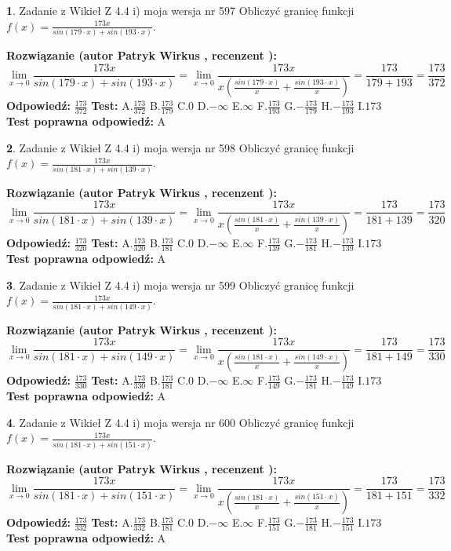 \documentclass[12pt, a4paper]{article}
\theoremstyle{definition} %
\newtheorem{zad}{}
\newcommand{\zadStart}[1]{\begin{zad}#1\newline}
\newcommand{\zadStop}{\end{zad}}
\newcommand{\rozwStart}[2]{\noindent \textbf{Rozwiązanie (autor #1 , recenzent #2): }\newline}
\newcommand{\rozwStop}{\newline}
\newcommand{\odpStart}{\noindent \textbf{Odpowiedź:}\newline}
\newcommand{\odpStop}{\newline}
\newcommand{\testStart}{\noindent \textbf{Test:}\newline}
\newcommand{\testStop}{\newline}
\newcommand{\kluczStart}{\noindent \textbf{Test poprawna odpowiedź:}\newline}
\newcommand{\kluczStop}{\newline}
\begin{document}
\zadStart{Zadanie z Wikieł Z 4.4 i) moja wersja nr 597}
Obliczyć granicę funkcji $f(x)=\frac{173x}{sin(179\cdot x) +sin(193\cdot x)}$.
\zadStop
\rozwStart{Patryk Wirkus}{}
$$\lim\limits_{x\to 0}\frac{173x}{sin(179\cdot x) +sin(193\cdot x)}=\lim\limits_{x\to 0}\frac{173x}{x(\frac{sin(179\cdot x)}{x}+\frac{sin(193\cdot x)}{x})}=\frac{173}{179+193} = \frac{173}{372}$$
\rozwStop
\odpStart
$\frac{173}{372}$
\odpStop
\testStart
A.$\frac{173}{372}$
B.$\frac{173}{179}$
C.$0$
D.$-\infty$
E.$\infty$
F.$\frac{173}{193}$
G.$-\frac{173}{179}$
H.$-\frac{173}{193}$
I.$173$
\testStop
\kluczStart
A
\kluczStop



\zadStart{Zadanie z Wikieł Z 4.4 i) moja wersja nr 598}
Obliczyć granicę funkcji $f(x)=\frac{173x}{sin(181\cdot x) +sin(139\cdot x)}$.
\zadStop
\rozwStart{Patryk Wirkus}{}
$$\lim\limits_{x\to 0}\frac{173x}{sin(181\cdot x) +sin(139\cdot x)}=\lim\limits_{x\to 0}\frac{173x}{x(\frac{sin(181\cdot x)}{x}+\frac{sin(139\cdot x)}{x})}=\frac{173}{181+139} = \frac{173}{320}$$
\rozwStop
\odpStart
$\frac{173}{320}$
\odpStop
\testStart
A.$\frac{173}{320}$
B.$\frac{173}{181}$
C.$0$
D.$-\infty$
E.$\infty$
F.$\frac{173}{139}$
G.$-\frac{173}{181}$
H.$-\frac{173}{139}$
I.$173$
\testStop
\kluczStart
A
\kluczStop



\zadStart{Zadanie z Wikieł Z 4.4 i) moja wersja nr 599}
Obliczyć granicę funkcji $f(x)=\frac{173x}{sin(181\cdot x) +sin(149\cdot x)}$.
\zadStop
\rozwStart{Patryk Wirkus}{}
$$\lim\limits_{x\to 0}\frac{173x}{sin(181\cdot x) +sin(149\cdot x)}=\lim\limits_{x\to 0}\frac{173x}{x(\frac{sin(181\cdot x)}{x}+\frac{sin(149\cdot x)}{x})}=\frac{173}{181+149} = \frac{173}{330}$$
\rozwStop
\odpStart
$\frac{173}{330}$
\odpStop
\testStart
A.$\frac{173}{330}$
B.$\frac{173}{181}$
C.$0$
D.$-\infty$
E.$\infty$
F.$\frac{173}{149}$
G.$-\frac{173}{181}$
H.$-\frac{173}{149}$
I.$173$
\testStop
\kluczStart
A
\kluczStop



\zadStart{Zadanie z Wikieł Z 4.4 i) moja wersja nr 600}
Obliczyć granicę funkcji $f(x)=\frac{173x}{sin(181\cdot x) +sin(151\cdot x)}$.
\zadStop
\rozwStart{Patryk Wirkus}{}
$$\lim\limits_{x\to 0}\frac{173x}{sin(181\cdot x) +sin(151\cdot x)}=\lim\limits_{x\to 0}\frac{173x}{x(\frac{sin(181\cdot x)}{x}+\frac{sin(151\cdot x)}{x})}=\frac{173}{181+151} = \frac{173}{332}$$
\rozwStop
\odpStart
$\frac{173}{332}$
\odpStop
\testStart
A.$\frac{173}{332}$
B.$\frac{173}{181}$
C.$0$
D.$-\infty$
E.$\infty$
F.$\frac{173}{151}$
G.$-\frac{173}{181}$
H.$-\frac{173}{151}$
I.$173$
\testStop
\kluczStart
A
\kluczStop
\end{document}
